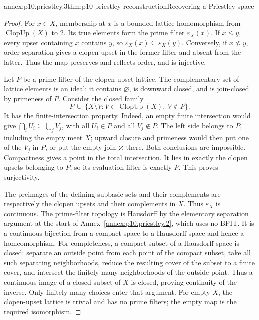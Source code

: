 \begin{annexitem}{annex:p10.priestley.3}{thm:p10-priestley-reconstruction}{Recovering a Priestley space}
\begin{proof}
For \(x\in X\), membership at \(x\) is a bounded lattice
homomorphism from \(\operatorname{ClopUp}(X)\) to \(2\).
Its true elements form the prime filter \(\varepsilon_X(x)\).
If \(x\leq y\), every upset containing \(x\) contains \(y\),
so \(\varepsilon_X(x)\subseteq\varepsilon_X(y)\).
Conversely, if \(x\not\leq y\), order separation gives a
clopen upset in the former filter and absent from the latter.
Thus the map preserves and reflects order, and is injective.

Let \(P\) be a prime filter of the clopen-upset lattice.
The complementary set of lattice elements is an ideal:
it contains \(\varnothing\), is downward closed, and is join-closed
by primeness of \(P\).
Consider the closed family
\[
 P\ \cup\ \{X\setminus V:V\in\operatorname{ClopUp}(X),\ V\notin P\}.
\]
It has the finite-intersection property.
Indeed, an empty finite intersection would give
\(\bigcap_i U_i\subseteq\bigcup_j V_j\), with all \(U_i\in P\)
and all \(V_j\notin P\).
The left side belongs to \(P\), including the empty meet \(X\);
upward closure and primeness would then put one of the \(V_j\)
in \(P\), or put the empty join \(\varnothing\) there.
Both conclusions are impossible.
Compactness gives a point in the total intersection.
It lies in exactly the clopen upsets belonging to \(P\), so its
evaluation filter is exactly \(P\).
This proves surjectivity.

The preimages of the defining subbasic sets and their complements
are respectively the clopen upsets and their complements in \(X\).
Thus \(\varepsilon_X\) is continuous.
The prime-filter topology is Hausdorff by the elementary separation
argument at the start of Annex~\ref{annex:p10.priestley.2}, which
uses no BPIT.
It is a continuous bijection from a compact space to a Hausdorff
space and hence a homeomorphism.
For completeness, a compact subset of a Hausdorff space is closed:
separate an outside point from each point of the compact subset,
take all such separating neighborhoods, reduce the resulting
cover of the subset to a finite cover, and intersect the finitely
many neighborhoods of the outside point.
Thus a continuous image of a closed subset of \(X\) is closed,
proving continuity of the inverse.
Only finitely many choices enter that argument.
For empty \(X\), the clopen-upset lattice is trivial and has no
prime filters; the empty map is the required isomorphism.
\end{proof}
\end{annexitem}


